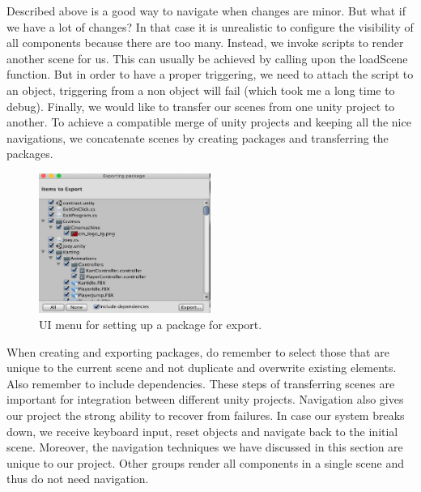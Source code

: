 \documentclass[a4paper,10pt]{article}
\begin{document}
Described above is a good way to navigate when changes are minor. But what if we have a lot of changes? In that case it is unrealistic to configure the visibility of all components because there are too many. Instead, we invoke scripts to render another scene for us. This can usually be achieved by calling upon the loadScene function. But in order to have a proper triggering, we need to attach the script to an object, triggering from a non object will fail (which took me a long time to debug). Finally, we would like to transfer our scenes from one unity project to another. To achieve a compatible merge of unity projects and keeping all the nice navigations, we concatenate scenes by creating packages and transferring the packages. 

 \begin{figure}[H]
  \centering
      \includegraphics[width=0.5\textwidth]{Assets/Export.png}
  \caption{UI menu for setting up a package for export.}
\end{figure}

When creating and exporting packages, do remember to select those that are unique to the current scene and not duplicate and overwrite existing elements. Also remember to include dependencies. These steps of transferring scenes are important for integration between different unity projects.
Navigation also gives our project the strong ability to recover from failures. In case our system breaks down, we receive keyboard input, reset objects and navigate back to the initial scene. 
Moreover, the navigation techniques we have discussed in this section are unique to our project. Other groups render all components in a single scene and thus do not need navigation.
\end{document}

